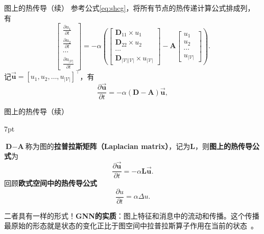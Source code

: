 \documentclass{beamer}
\newenvironment{formal}{%
	\def\FrameCommand{%
		\hspace{1pt}%
		{\color{deepgreen}\vrule width 2pt}%
		{\color{greenshade}\vrule width 4pt}%
		\colorbox{greenshade}%
	}%
	\MakeFramed{\advance\hsize-\width\FrameRestore}%
	\noindent\hspace{-4.55pt}%
	\begin{adjustwidth}{}{7pt}%
		\vspace{2pt}\vspace{2pt}%
	}
	{%
		\vspace{2pt}
	\end{adjustwidth}\endMakeFramed%
}
\begin{document}
\begin{frame}{图上的热传导（续）}
	参考公式\ref{eq:shcg}，将所有节点的热传递计算公式排成列，有
	\begin{equation}
		\begin{bmatrix}
			\frac{\partial u_1}{\partial t} \\ \frac{\partial u_2}{\partial t} \\ \cdots \\ \frac{\partial u_{\left|\mathscr{V}\right|}}{\partial t}
		\end{bmatrix}
		=-\alpha\left(
		\begin{bmatrix}
			\textbf{D}_{11}\times u_1 \\ \textbf{D}_{22}\times u_2 \\ \cdots \\ \textbf{D}_{\left|\mathscr{V}\right|\left|\mathscr{V}\right|}\times u_{\left|\mathscr{V}\right|}
		\end{bmatrix} - \textbf{A}
		\begin{bmatrix}
			u_1 \\ u_2 \\ \cdots \\ u_{\left|\mathscr{V}\right|}
		\end{bmatrix}\right).
	\end{equation}
	记$\vec{\textbf{u}}=\left[u_1,u_2,\dots,u_{\left|\mathscr{V}\right|}\right]^\top$，有
	\begin{equation}
		\frac{\partial \vec{\textbf{u}}}{\partial t}=-\alpha\left(\textbf{D}-\textbf{A}\right)\vec{\textbf{u}},
	\end{equation}
\end{frame}

\begin{frame}{图上的热传导（续）}
	\begin{formal}
		$\textbf{D}-\textbf{A}$称为图的{\color{red}\textbf{拉普拉斯矩阵（Laplacian matrix）}}，记为$\textbf{L}$，则{\color{red}\textbf{图上的热传导公式}}为
		\begin{equation}
			\frac{\partial \vec{\textbf{u}}}{\partial t}=-\alpha\textbf{L}\vec{\textbf{u}}.
		\end{equation}
		回顾{\color{red}\textbf{欧式空间中的热传导公式}}
		\begin{equation*}
			\frac{\partial u}{\partial t}=\alpha\Delta u.
		\end{equation*}
	\end{formal}
	{\color{red}二者具有一样的形式！}\textbf{GNN的实质}：图上特征和消息中的流动和传播。这个传播最原始的形态就是状态的变化正比于图空间中拉普拉斯算子作用在当前的状态~\cite{jr2019gcn}。
\end{frame}
\end{document}

